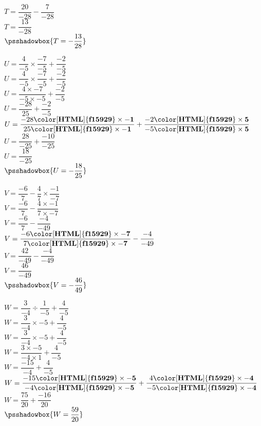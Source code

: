 \begin{corrige}
\begin{multicols}
\begin{list}{}{}
\begin{spacing}{2}
                $T = \dfrac{20}{-28} - \dfrac{7}{-28}$ \\
                $T = \dfrac{13}{-28}$ \\
                $\psshadowbox{T = -\dfrac{13}{28}}$
                \item 
                $U = \dfrac{4}{-5}  \times  \dfrac{-7}{-5} + \dfrac{-2}{-5}$ \\
                $U = \dfrac{4}{-5}\times \dfrac{-7}{-5} + \dfrac{-2}{-5}$ \\
                $U = \dfrac{4\times-7}{-5\times-5} + \dfrac{-2}{-5}$ \\
                $U = \dfrac{-28}{25} + \dfrac{-2}{-5}$ \\
                $U = \dfrac{-28\mathbf{{\color[HTML]{f15929}\times-1}}}{25\mathbf{{\color[HTML]{f15929}\times-1}}} + \dfrac{-2\mathbf{{\color[HTML]{f15929}\times5}}}{-5\mathbf{{\color[HTML]{f15929}\times5}}}$ \\
                $U = \dfrac{28}{-25} + \dfrac{-10}{-25}$ \\
                $U = \dfrac{18}{-25}$ \\
                $\psshadowbox{U = -\dfrac{18}{25}}$
                \item 
                $V = \dfrac{-6}{7} - \dfrac{4}{7}  \times  \dfrac{-1}{-7}$ \\
                $V = \dfrac{-6}{7} - \dfrac{4\times-1}{7\times-7}$ \\
                $V = \dfrac{-6}{7} - \dfrac{-4}{-49}$ \\
                $V = \dfrac{-6\mathbf{{\color[HTML]{f15929}\times-7}}}{7\mathbf{{\color[HTML]{f15929}\times-7}}} - \dfrac{-4}{-49}$ \\
                $V = \dfrac{42}{-49} - \dfrac{-4}{-49}$ \\
                $V = \dfrac{46}{-49}$ \\
                $\psshadowbox{V = -\dfrac{46}{49}}$
                \item 
                $W = \dfrac{3}{-4}  \div  \dfrac{1}{-5} + \dfrac{4}{-5}$ \\
                $W = \dfrac{3}{-4} \times -5 + \dfrac{4}{-5}$ \\
                $W = \dfrac{3}{-4}\times -5 + \dfrac{4}{-5}$ \\
                $W = \dfrac{3\times-5}{-4\times1} + \dfrac{4}{-5}$ \\
                $W = \dfrac{-15}{-4} + \dfrac{4}{-5}$ \\
                $W = \dfrac{-15\mathbf{{\color[HTML]{f15929}\times-5}}}{-4\mathbf{{\color[HTML]{f15929}\times-5}}} + \dfrac{4\mathbf{{\color[HTML]{f15929}\times-4}}}{-5\mathbf{{\color[HTML]{f15929}\times-4}}}$ \\
                $W = \dfrac{75}{20} + \dfrac{-16}{20}$ \\
                $\psshadowbox{W = \dfrac{59}{20}}$
            \end{spacing}
        \end{list}
    \end{multicols}
\end{corrige}


